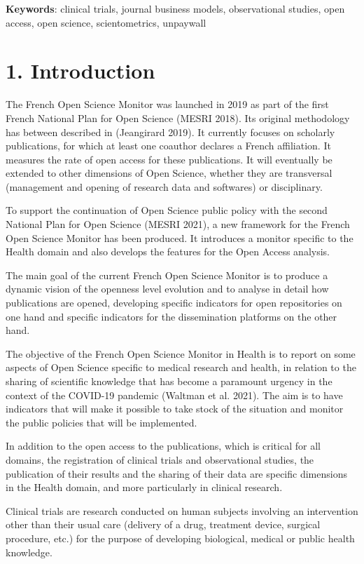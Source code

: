 \documentclass[
]{article}
\begin{document}
\textbf{Keywords}: clinical trials, journal business models,
observational studies, open access, open science, scientometrics,
unpaywall

\hypertarget{introduction}{%
\section{1. Introduction}\label{introduction}}

The French Open Science Monitor was launched in 2019 as part of the
first French National Plan for Open Science (MESRI 2018). Its original
methodology has between described in (Jeangirard 2019). It currently
focuses on scholarly publications, for which at least one coauthor
declares a French affiliation. It measures the rate of open access for
these publications. It will eventually be extended to other dimensions
of Open Science, whether they are transversal (management and opening of
research data and softwares) or disciplinary.

To support the continuation of Open Science public policy with the
second National Plan for Open Science (MESRI 2021), a new framework for
the French Open Science Monitor has been produced. It introduces a
monitor specific to the Health domain and also develops the features for
the Open Access analysis.

The main goal of the current French Open Science Monitor is to produce a
dynamic vision of the openness level evolution and to analyse in detail
how publications are opened, developing specific indicators for open
repositories on one hand and specific indicators for the dissemination
platforms on the other hand.

The objective of the French Open Science Monitor in Health is to report
on some aspects of Open Science specific to medical research and health,
in relation to the sharing of scientific knowledge that has become a
paramount urgency in the context of the COVID-19 pandemic (Waltman et
al. 2021). The aim is to have indicators that will make it possible to
take stock of the situation and monitor the public policies that will be
implemented.

In addition to the open access to the publications, which is critical
for all domains, the registration of clinical trials and observational
studies, the publication of their results and the sharing of their data
are specific dimensions in the Health domain, and more particularly in
clinical research.

Clinical trials are research conducted on human subjects involving an
intervention other than their usual care (delivery of a drug, treatment
device, surgical procedure, etc.) for the purpose of developing
biological, medical or public health knowledge.
\end{document}
